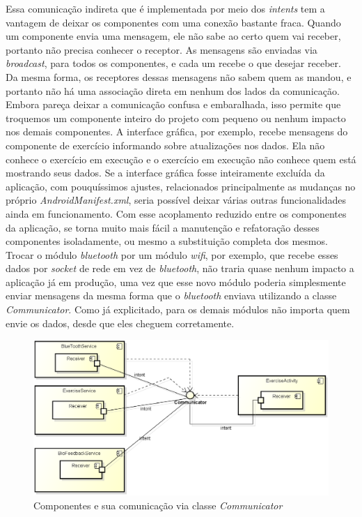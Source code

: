 Essa comunicação indireta que é implementada por meio dos \textit{intents} tem a vantagem de deixar os componentes com uma conexão bastante fraca. Quando um componente envia uma mensagem, ele não sabe ao certo quem vai receber, portanto não precisa conhecer o receptor. As mensagens são enviadas via \textit{broadcast}, para todos os componentes, e cada um recebe o que desejar receber. Da mesma forma, os receptores dessas mensagens não sabem quem as mandou, e portanto não há uma associação direta em nenhum dos lados da comunicação. Embora pareça deixar a comunicação confusa e embaralhada, isso permite que troquemos um componente inteiro do projeto com pequeno ou nenhum impacto nos demais componentes. A interface gráfica, por exemplo, recebe mensagens do componente de exercício informando sobre atualizações nos dados. Ela não conhece o exercício em execução e o exercício em execução não conhece quem está mostrando seus dados. Se a interface gráfica fosse inteiramente excluída da aplicação, com pouquíssimos ajustes, relacionados principalmente as mudanças no próprio \textit{AndroidManifest.xml}, seria possível deixar várias outras funcionalidades ainda em funcionamento. Com esse acoplamento reduzido entre os componentes da aplicação, se torna muito mais fácil a manutenção e refatoração desses componentes isoladamente, ou mesmo a substituição completa dos mesmos. Trocar o módulo \textit{bluetooth} por um módulo \textit{wifi}, por exemplo, que recebe esses dados por \textit{socket} de rede em vez de \textit{bluetooth}, não traria quase nenhum impacto a aplicação já em produção, uma vez que esse novo módulo poderia simplesmente enviar mensagens da mesma forma que o \textit{bluetooth} enviava utilizando a classe \textit{Communicator}. Como já explicitado, para os demais módulos não importa quem envie os dados, desde que eles cheguem corretamente. 

\begin{figure}[!htb]
\centering
\includegraphics [keepaspectratio=true,scale=0.60]{figuras/diagramaComponentes.eps}
\caption{Componentes e sua comunicação via classe \textit{Communicator}}
\label{diagramaComponentes}
\end{figure}

